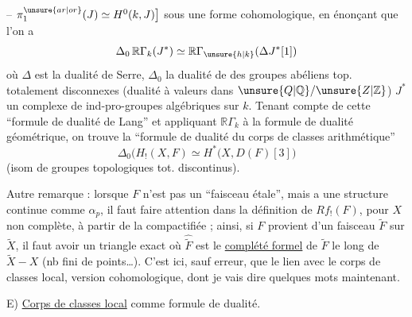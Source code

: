  -- $\pi_1^{\unsure{ar|or}}(J)\simeq H^0(k,J)\bigr]$ sous une forme cohomologique, en énonçant que l'on a
\[
\Delta_0\,\mathbb{R}\Gamma_k(J^*)\simeq\mathbb{R}\Gamma_{\unsure{h|k}}(\Delta J^*[1])
\]
où $\Delta$ est la dualité de Serre, $\Delta_0$ la dualité de  des groupes abéliens top. totalement disconnexes (dualité à valeurs dans $\unsure{Q|\mathbb Q}/\unsure{Z|\mathbb Z}$) $J^*$ un complexe de ind-pro-groupes algébriques sur $k$. Tenant compte de cette ``formule de dualité de Lang'' et appliquant $\mathbb{R}\Gamma_k$ à la formule de dualité  géométrique, on trouve la ``formule de dualité du corps de classes arithmétique''
\[
\boxed{\Delta_0\bigl(H_!(X,F)\simeq H^*\bigl(X,D(F)[3]\bigr)}
\]
(isom de groupes topologiques tot. discontinus).

Autre remarque : lorsque $F$ n'est pas un ``faisceau étale'', mais a une structure continue comme $\alpha_p$, il faut faire attention dans la définition de $Rf_!(F)$, pour $X$ non complète, à partir de la compactifiée  ; ainsi, si $F$ provient d'un faisceau  $\widetilde F$ sur $\widetilde X$, il faut avoir un triangle exact
où $\widehat{\widetilde F}$ est le \uline{complété formel} de $\widetilde F$ le long de $\widetilde X-X$ (nb fini de points\ldots). C'est ici, sauf erreur, que  le lien avec le corps de classes local, version cohomologique, dont je vais dire quelques mots maintenant.

E) \uline{Corps de classes local} comme formule de dualité.

